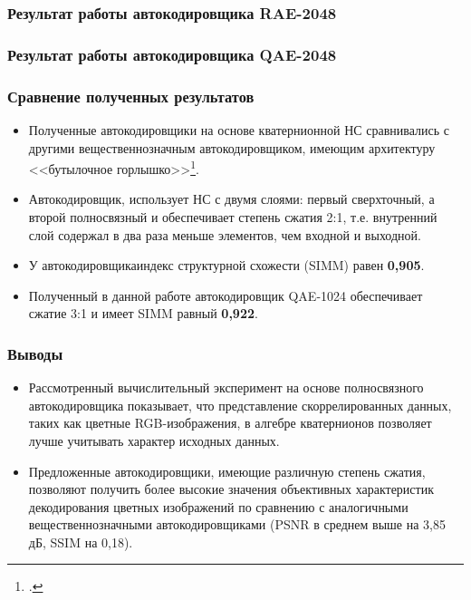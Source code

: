 \begin{frame}[t]
\frametitle{Результат работы автокодировщика RAE-2048}
\centering
\end{frame}

\begin{frame}[t]
    \frametitle{Результат работы автокодировщика QAE-2048}
    \centering
\end{frame}

\begin{frame}[t]
\frametitle{Сравнение полученных результатов}
\begin{itemize}
    \item Полученные автокодировщики на основе кватернионной НС сравнивались с 
    другими вещественнозначным автокодировщиком, имеющим архитектуру 
    <<бутылочное горлышко>>\footcite{watkins2018image}.
    \item Автокодировщик\footnotemark[1], использует НС с 
    двумя слоями: первый сверхточный, а второй полносвязный и 
    обеспечивает степень сжатия 2:1, т.е. внутренний слой содержал 
    в два раза меньше элементов, чем входной и выходной.
    \item У автокодировщика\footnotemark[1]  
    индекс структурной схожести (SIMM) равен {\bf 0,905}. 
    \item Полученный в данной работе автокодировщик QAE-1024 обеспечивает 
    сжатие 3:1 и имеет SIMM равный \textbf{0,922}.
\end{itemize}

\end{frame}

\begin{frame}[t]
\frametitle{Выводы}
\begin{itemize}
    \item Рассмотренный вычислительный эксперимент на основе 
    полносвязного автокодировщика показывает, что представление 
    скоррелированных данных, таких как цветные RGB-изображения, 
    в алгебре кватернионов позволяет лучше учитывать характер 
    исходных данных. 
    \item Предложенные автокодировщики, имеющие различную степень 
    сжатия, позволяют получить более высокие значения объективных 
    характеристик декодирования цветных изображений по сравнению с 
    аналогичными вещественнозначными автокодировщиками (PSNR в среднем 
    выше на 3,85 дБ, SSIM на 0,18).
\end{itemize}
\end{frame}

